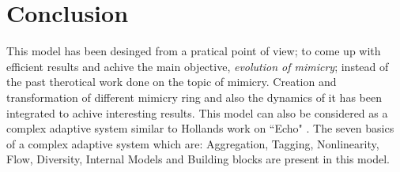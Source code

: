 \section{Conclusion}
This model has been desinged from a pratical point of view; to come up with efficient results and achive the main objective, \textit{evolution of mimicry}; instead of the past therotical work done on the topic of mimicry. Creation and transformation of different mimicry ring and also the dynamics of it has been integrated to achive interesting results. This model can also be considered as a complex adaptive system similar to Hollands work on ``Echo" \cite{holland1996}. The seven basics of a complex adaptive system which are: Aggregation, Tagging, Nonlinearity, Flow, Diversity, Internal Models and Building blocks are present in this model.